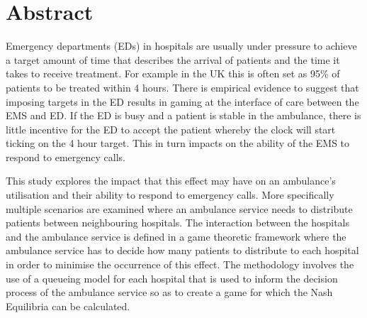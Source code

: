 \section{Abstract}
Emergency departments (EDs) in hospitals are usually under pressure to achieve a target amount of time that describes the arrival of patients and the time it takes to receive treatment. For example in the UK this is often set as 95\% of patients to be treated within 4 hours. There is empirical evidence to suggest that imposing targets in the ED results in gaming at the interface of care between the EMS and ED. If the ED is busy and a patient is stable in the ambulance, there is little incentive for the ED to accept the patient whereby the clock will start ticking on the 4 hour target. This in turn impacts on the ability of the EMS to respond to emergency calls.

This study explores the impact that this effect may have on an ambulance's utilisation and their ability to respond to emergency calls. More specifically multiple scenarios are examined where an ambulance service needs to distribute patients between neighbouring hospitals. The interaction between the hospitals and the ambulance service is defined in a game theoretic framework where the ambulance service has to decide how many patients to distribute to each hospital in order to minimise the occurrence of this effect. The methodology involves the use of a queueing model for each hospital that is used to inform the decision process of the ambulance service so as to create a game for which the Nash Equilibria can be calculated.
